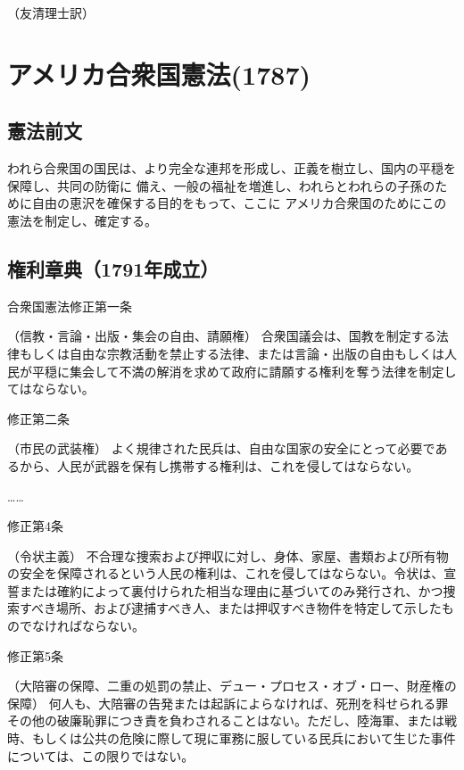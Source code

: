   \begin{flushright}
    （友清理士訳）
  \end{flushright}



  \section{アメリカ合衆国憲法(1787)}

  \subsection{憲法前文}


われら合衆国の国民は、より完全な連邦を形成し、正義を樹立し、国内の平穏を保障し、共同の防衛に 備え、一般の福祉を増進し、われらとわれらの子孫のために自由の恵沢を確保する目的をもって、ここに アメリカ合衆国のためにこの憲法を制定し、確定する。


\subsection{権利章典（1791年成立） }
\label{sec:1791-}

合衆国憲法修正第一条

（信教・言論・出版・集会の自由、請願権）
合衆国議会は、国教を制定する法律もしくは自由な宗教活動を禁止する法律、または言論・出版の自由もしくは人民が平穏に集会して不満の解消を求めて政府に請願する権利を奪う法律を制定してはならない。


修正第二条

（市民の武装権） 
よく規律された民兵は、自由な国家の安全にとって必要であるから、人民が武器を保有し携帯する権利は、これを侵してはならない。

……

修正第4条

（令状主義）
不合理な捜索および押収に対し、身体、家屋、書類および所有物の安全を保障されるという人民の権利は、これを侵してはならない。令状は、宣誓または確約によって裏付けられた相当な理由に基づいてのみ発行され、かつ捜索すべき場所、および逮捕すべき人、または押収すべき物件を特定して示したものでなければならない。


修正第5条

（大陪審の保障、二重の処罰の禁止、デュー・プロセス・オブ・ロー、財産権の保障）
何人も、大陪審の告発または起訴によらなければ、死刑を科せられる罪その他の破廉恥罪につき責を負わされることはない。ただし、陸海軍、または戦時、もしくは公共の危険に際して現に軍務に服している民兵において生じた事件については、この限りではない。

